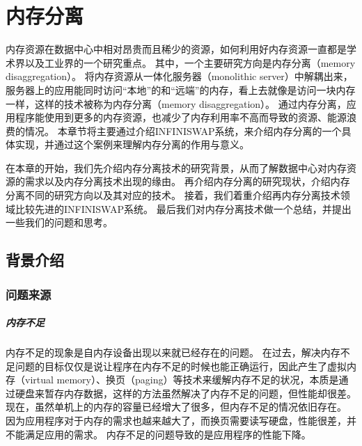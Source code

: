 
\chapter{内存分离} %

\label{Chapter2} %

%

内存资源在数据中心中相对昂贵而且稀少的资源，如何利用好内存资源一直都是学术界以及工业界的一个研究重点。
其中，一个主要研究方向是内存分离（memory disaggregation）。
将内存资源从一体化服务器（monolithic server）中解耦出来，服务器上的应用能同时访问“本地”的和“远端”的内存，看上去就像是访问一块内存一样，这样的技术被称为内存分离（memory disaggregation）。
通过内存分离，应用程序能使用到更多的内存资源，也减少了内存利用率不高而导致的资源、能源浪费的情况。
本章节将主要通过介绍INFINISWAP系统，来介绍内存分离的一个具体实现，并通过这个案例来理解内存分离的作用与意义。

在本章的开始，我们先介绍内存分离技术的研究背景，从而了解数据中心对内存资源的需求以及内存分离技术出现的缘由。
再介绍内存分离的研究现状，介绍内存分离不同的研究方向以及其对应的技术。
接着，我们着重介绍再内存分离技术领域比较先进的INFINISWAP系统\cite{gu2017efficient}。
最后我们对内存分离技术做一个总结，并提出一些我们的问题和思考。


\section{背景介绍}

\subsection{问题来源}
\paragraph{内存不足} 
内存不足的现象是自内存设备出现以来就已经存在的问题。
在过去，解决内存不足问题的目标仅仅是说让程序在内存不足的时候也能正确运行，因此产生了虚拟内存（virtual memory）、换页（paging）等技术来缓解内存不足的状况，本质是通过硬盘来暂存内存数据，这样的方法虽然解决了内存不足的问题，但性能却很差。
现在，虽然单机上的内存的容量已经增大了很多，但内存不足的情况依旧存在。
因为应用程序对于内存的需求也越来越大了，而换页需要读写硬盘，性能很差，并不能满足应用的需求。
内存不足的问题导致的是应用程序的性能下降。

